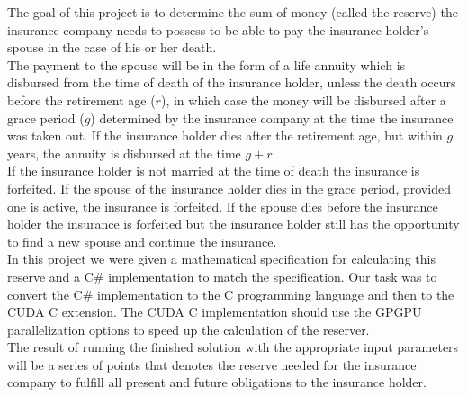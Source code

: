 
The goal of this project is to determine the sum of money (called the reserve) the insurance company needs to possess to be able to pay the insurance holder's spouse in the case of his or her death. \\

The payment to the spouse will be in the form of a life annuity which is disbursed from the time of death of the insurance holder, unless the death occurs before the retirement age ($r$), in which case the money will be disbursed after a grace period ($g$) determined by the insurance company at the time the insurance was taken out. If the insurance holder dies after the retirement age, but within $g$ years, the annuity is disbursed at the time $g + r$. \\

If the insurance holder is not married at the time of death the insurance is forfeited. If the spouse of the insurance holder dies in the grace period, provided one is active, the insurance is forfeited. If the spouse dies before the insurance holder the insurance is forfeited but the insurance holder still has the opportunity to find a new spouse and continue the insurance. \\

In this project we were given a mathematical specification for calculating this reserve \cite{edlu} and a C\# implementation to match the specification. Our task was to convert the C\# implementation to the C programming language and then to the CUDA C extension. The CUDA C implementation should use the GPGPU parallelization options to speed up the calculation of the reserver. \\

The result of running the finished solution with the appropriate input parameters will be a series of points that denotes the reserve needed for the insurance company to fulfill all present and future obligations to the insurance holder.


